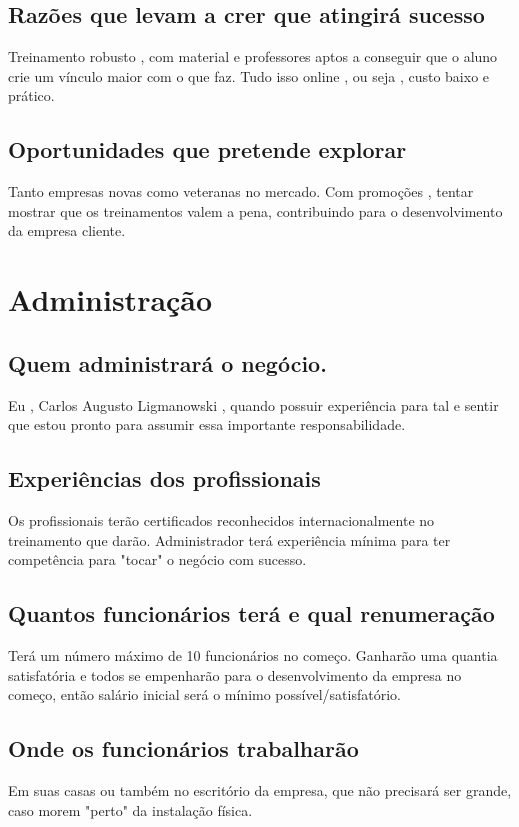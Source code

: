 \documentclass[10pt]{article}
\begin{document}
\subsection{Razões que levam a crer que atingirá sucesso}
Treinamento robusto , com material e professores aptos a conseguir que o aluno crie um vínculo maior com o que faz. Tudo isso online , ou seja , custo baixo e prático.

\subsection{Oportunidades que pretende explorar}
Tanto empresas novas como veteranas no mercado. Com promoções , tentar mostrar que os treinamentos valem a pena, contribuindo para o desenvolvimento da empresa cliente.

\section{Administração}

\subsection{Quem administrará o negócio.}
Eu , Carlos Augusto Ligmanowski , quando possuir experiência para tal e sentir que estou pronto para assumir essa importante responsabilidade. 

\subsection{Experiências dos profissionais}
Os profissionais terão certificados reconhecidos internacionalmente no treinamento que darão. Administrador terá experiência mínima para ter competência para "tocar" o negócio com sucesso.

\subsection{Quantos funcionários terá e qual renumeração}
Terá um número máximo de 10 funcionários no começo. Ganharão uma quantia satisfatória e todos se empenharão para o desenvolvimento da empresa no começo, então salário inicial será o mínimo possível/satisfatório.

\subsection{Onde os funcionários trabalharão}
Em suas casas ou também no escritório da empresa, que não precisará ser grande, caso morem "perto" da instalação física.
 
\end{document}
